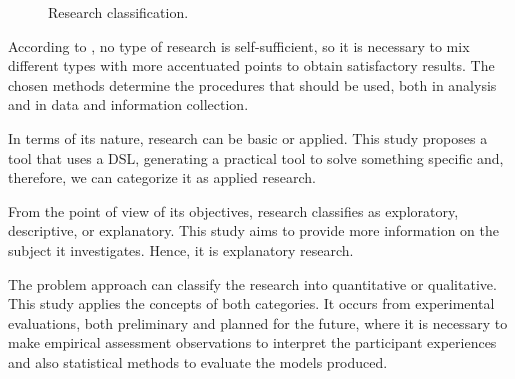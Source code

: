 \begin{figure}[!htb]
    \centering
    \caption{Research classification.}
    
    \label{fig:ResearchClassification}
\end{figure}

According to \cite{Prodanov:2013}, no type of research is self-sufficient, so it is necessary to mix different types with more accentuated points to obtain satisfactory results.
The chosen methods determine the procedures that should be used, both in analysis and in data and information collection.

In terms of its nature, research can be basic or applied.
This study proposes a tool that uses a DSL, generating a practical tool to solve something specific and, therefore, we can categorize it as applied research.

From the point of view of its objectives, research classifies as exploratory, descriptive, or explanatory. 
This study aims to provide more information on the subject it investigates. Hence, it is explanatory research.

The problem approach can classify the research into quantitative or qualitative.
This study applies the concepts of both categories.
It occurs from experimental evaluations, both preliminary and planned for the future, where it is necessary to make empirical assessment observations to interpret the participant experiences and also statistical methods to evaluate the models produced.

